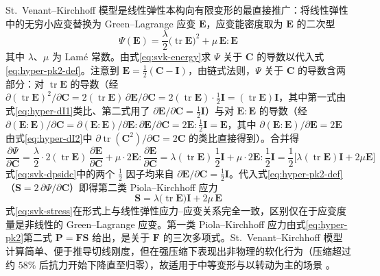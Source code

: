 St.~Venant--Kirchhoff 模型是线性弹性本构向有限变形的最直接推广：将线性弹性中的无穷小应变替换为 Green--Lagrange 应变 $\mathbf{E}$，应变能密度取为 $\mathbf{E}$ 的二次型
\begin{equation}
  \Psi(\mathbf{E})=\frac{\lambda}{2}\bigl(\operatorname{tr}\mathbf{E}\bigr)^{2}+\mu\,\mathbf{E}:\mathbf{E}
  \label{eq:svk-energy}
\end{equation}
其中 $\lambda$、$\mu$ 为 Lam\'e 常数。由式\eqref{eq:svk-energy}求 $\Psi$ 关于 $\mathbf{C}$ 的导数以代入式\eqref{eq:hyper-pk2-def}。注意到 $\mathbf{E}=\tfrac{1}{2}(\mathbf{C}-\mathbf{I})$，由链式法则，$\Psi$ 关于 $\mathbf{C}$ 的导数含两部分：对 $\operatorname{tr}\mathbf{E}$ 的导数（经 $\partial(\operatorname{tr}\mathbf{E})^{2}/\partial\mathbf{C}=2(\operatorname{tr}\mathbf{E})\,\partial\mathbf{E}/\partial\mathbf{C}=2(\operatorname{tr}\mathbf{E})\cdot\tfrac{1}{2}\mathbf{I}=(\operatorname{tr}\mathbf{E})\mathbf{I}$，其中第一式由式\eqref{eq:hyper-dI1}类比、第二式用了 $\partial\mathbf{E}/\partial\mathbf{C}=\tfrac{1}{2}\mathbf{I}$）与对 $\mathbf{E}:\mathbf{E}$ 的导数（经 $\partial(\mathbf{E}:\mathbf{E})/\partial\mathbf{C}=\partial(\mathbf{E}:\mathbf{E})/\partial\mathbf{E}:\partial\mathbf{E}/\partial\mathbf{C}=2\mathbf{E}:\tfrac{1}{2}\mathbf{I}=\mathbf{E}$，其中 $\partial(\mathbf{E}:\mathbf{E})/\partial\mathbf{E}=2\mathbf{E}$ 由式\eqref{eq:hyper-dI2}中 $\partial\operatorname{tr}(\mathbf{C}^{2})/\partial\mathbf{C}=2\mathbf{C}$ 的类比直接得到）。合并得
\begin{equation}
  \frac{\partial\Psi}{\partial\mathbf{C}}
  =\frac{\lambda}{2}\cdot 2(\operatorname{tr}\mathbf{E})\,\frac{\partial\mathbf{E}}{\partial\mathbf{C}}+\mu\cdot 2\mathbf{E}:\frac{\partial\mathbf{E}}{\partial\mathbf{C}}
  =\lambda(\operatorname{tr}\mathbf{E})\,\frac{1}{2}\mathbf{I}+\mu\cdot 2\mathbf{E}:\frac{1}{2}\mathbf{I}
  =\frac{1}{2}\bigl[\lambda(\operatorname{tr}\mathbf{E})\mathbf{I}+2\mu\mathbf{E}\bigr]
  \label{eq:svk-dpsidc}
\end{equation}
式\eqref{eq:svk-dpsidc}中的两个 $\tfrac{1}{2}$ 因子均来自 $\partial\mathbf{E}/\partial\mathbf{C}=\tfrac{1}{2}\mathbf{I}$。代入式\eqref{eq:hyper-pk2-def}（$\mathbf{S}=2\,\partial\Psi/\partial\mathbf{C}$）即得第二类 Piola--Kirchhoff 应力
\begin{equation}
  \mathbf{S}=\lambda\bigl(\operatorname{tr}\mathbf{E}\bigr)\mathbf{I}+2\mu\,\mathbf{E}
  \label{eq:svk-stress}
\end{equation}
式\eqref{eq:svk-stress}在形式上与线性弹性应力--应变关系完全一致，区别仅在于应变度量是非线性的 Green--Lagrange 应变。第一类 Piola--Kirchhoff 应力由式\eqref{eq:hyper-pk2}第二式 $\mathbf{P}=\mathbf{F}\mathbf{S}$ 给出，是关于 $\mathbf{F}$ 的三次多项式。St.~Venant--Kirchhoff 模型计算简单、便于推导切线刚度，但在强压缩下表现出非物理的软化行为（压缩超过约 $58\%$ 后抗力开始下降直至归零），故适用于中等变形与以转动为主的场景 \cite{Ogden1997}。

